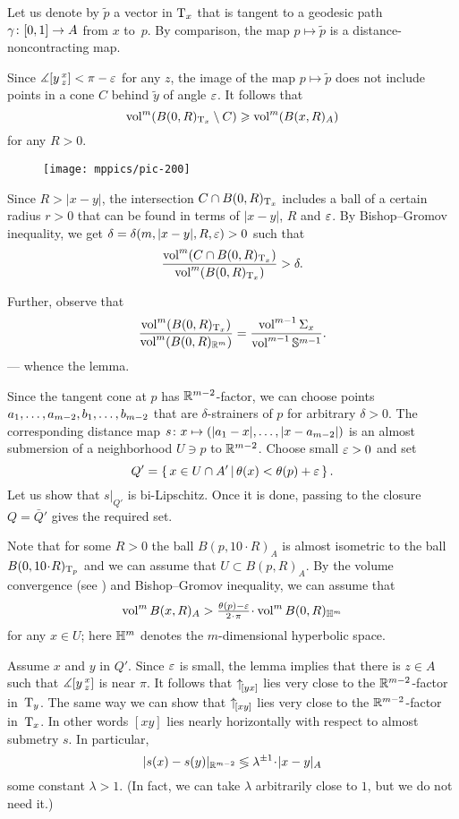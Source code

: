 Let us denote by $\tilde p$ a vector in $\mathrm{T}_x$ that is tangent to a geodesic path $\gamma\:[0,1]\zz\to A$ from $x$ to~$p$.
By comparison, the map $p\mapsto \tilde p$ is a distance-noncontracting map.

Since $\measuredangle[y\,{}^{x}_{z}]<\pi-\varepsilon$ for any $z$, the image of the map $p\mapsto \tilde p$ does not include points in a cone $C$ behind $\tilde y$ of angle $\varepsilon$.
It follows that 
\[\operatorname{vol}^m(B(0,R)_{\mathrm{T}_x}\setminus C)\geqslant \operatorname{vol}^m(B(x,R)_A)\]
for any $R>0$.

\begin{wrapfigure}{r}{35 mm}
\vskip-0mm
\centering
\texttt{[image: mppics/pic-200]}
\vskip0mm
\end{wrapfigure}

Since $R>|x-y|$, the intersection $C\zz\cap B(0,R)_{\T_x}$ includes a ball of a certain radius $r>0$ that can be found in terms of $|x-y|$, $R$ and $\varepsilon$.
By Bishop--Gromov inequality, we get $\delta=\delta( m, |x-y|, R, \varepsilon)>0$ such that 
\[\frac{\operatorname{vol}^m(C\cap B(0,R)_{\mathrm{T}_x})}{\operatorname{vol}^m(B(0,R)_{\mathrm{T}_x})}>\delta.\]


Further, observe that 
\[\frac{\operatorname{vol}^m(B(0,R)_{\mathrm{T}_x})}{\operatorname{vol}^m(B(0,R)_{\mathbb{R}^m})}
=
\frac{\operatorname{vol}^{m-1} \Sigma_x}{\operatorname{vol}^{m-1} \mathbb{S}^{m-1}}.
\]
--- whence the lemma.
\qeds







Since the tangent cone at $p$ has $\mathbb{R}^{m-2}$-factor, 
we can choose points $a_1,\zz\dots,a_{m-2},b_1,\zz\dots,b_{m-2}$ that are $\delta$-strainers of $p$ for arbitrary $\delta>0$.
The corresponding distance map $s\:x\zz\mapsto (|a_1-x|,\zz\dots,|x-a_{m-2}|)$ is an almost submersion of a neighborhood $U\ni p$ to $\mathbb{R}^{m-2}$.
Choose small $\varepsilon>0$ and set 
\[Q'=\left\{\,x\in U\cap A'\,\middle|\,\theta(x)<\theta(p)+\varepsilon\,\right\}.\]
Let us show that $s|_{Q'}$ is bi-Lipschitz.
Once it is done, passing to the closure $Q=\bar Q'$ gives the required set. 

Note that for some $R>0$ the ball $B(p,10\cdot R)_A$ is almost isometric to the ball $B(0,10\cdot R)_{\T_p}$
and we can assume that $U\subset B(p,R)_A$.
By the volume convergence (see \cite[10.8]{BGP}) and Bishop--Gromov inequality, we can assume that 
\[\vol^m B(x,R)_A>\tfrac{\theta(p)-\eps}{2\cdot \pi}\cdot\vol^m B(0,R)_{\HH^m}\]
for any $x\in U$; here $\mathbb{H}^m$ denotes the $m$-dimensional hyperbolic space. 

Assume $x$ and $y$ in $Q'$.
Since $\varepsilon$ is small, the lemma implies that there is $z\in A$ such that $\measuredangle[y\,{}^{x}_{z}]$ is near $\pi$.
It follows that ${\uparrow}_{\hskip-0.15em[{y}{x}]}$ lies very close to the $\mathbb{R}^{m-2}$-factor in~$\mathrm{T}_y$.
The same way we can show that ${\uparrow}_{\hskip-0.15em[{x}{y}]}$ lies very close to the $\mathbb{R}^{m-2}$-factor in~$\mathrm{T}_x$.
In other words $[xy]$ lies nearly horizontally with respect to almost submetry $s$.
In particular,  
\[|s(x)-s(y)|_{\RR^{m-2}} \lessgtr \lambda^{\pm1}\cdot |x-y|_{A}\]
some constant $\lambda>1$.
(In fact, we can take $\lambda$ arbitrarily close to $1$, but we do not need it.)
\qeds
